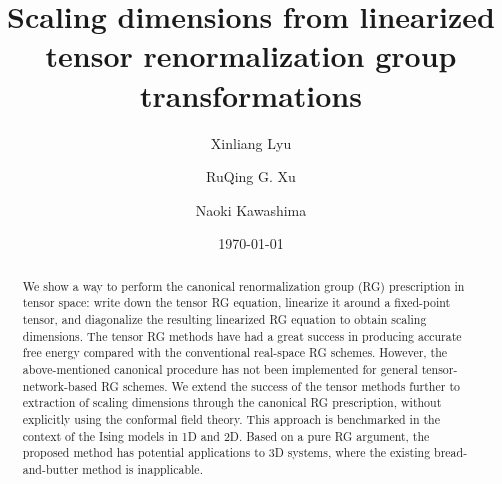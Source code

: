 \documentclass[aps,prr,reprint,superscriptaddress,nofootinbib,floatfix]{revtex4-2}
\begin{document}
\title{Scaling dimensions from linearized tensor renormalization group transformations}

\author{Xinliang Lyu} 
 \author{RuQing G. Xu}
 \author{Naoki Kawashima}
     

\date{\today}

\begin{abstract} 
    We show a way to perform the canonical renormalization group (RG) prescription in tensor space: write down the tensor RG equation, linearize it around a fixed-point tensor, and diagonalize the resulting linearized RG equation to obtain scaling dimensions. 
    The tensor RG methods have had a great success in producing accurate free energy compared with the conventional real-space RG schemes.
    However, the above-mentioned canonical procedure has not been implemented for general tensor-network-based RG schemes.
    We extend the success of the tensor methods further to extraction of scaling dimensions through the canonical RG prescription, without explicitly using the conformal field theory.
    This approach is benchmarked in the context of the Ising models in 1D and 2D.
    Based on a pure RG argument, the proposed method has potential applications to 3D systems, where the existing bread-and-butter method is inapplicable.
\end{abstract}

\maketitle

\end{document}
